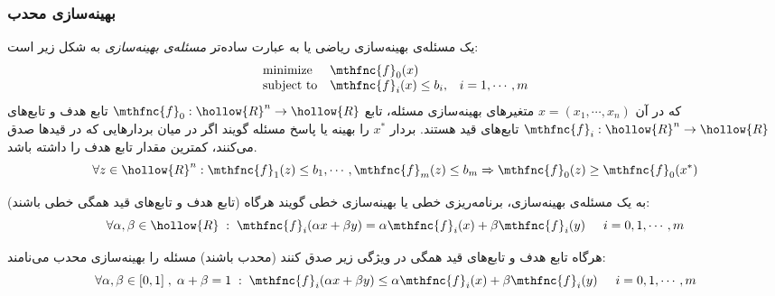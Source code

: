 
\subsubsection{
بهینه‌سازی محدب
\cite{convexoptimization}
}


یک مسئله‌ی بهینه‌سازی ریاضی یا به عبارت ساده‌تر 
\emph{
مسئله‌ی بهینه‌سازی
} 
به شکل زیر است:
\[
\begin{array}{lll}
\mbox{minimize} & \mthfnc{f}_0(x) & \\
\mbox{subject to} & \mthfnc{f}_i(x) \leq b_i, & i = 1, \cdots, m
\end{array}
\]
که در آن 
$x = (x_1, \cdots, x_n)$ 
متغیرهای بهینه‌سازی مسئله، تابع 
$\mthfnc{f}_0: \hollow{R}^n \rightarrow \hollow{R}$ 
تابع هدف
و تابع‌های 
$\mthfnc{f}_i: \hollow{R}^n \rightarrow \hollow{R}$ 
تابع‌های قید
هستند. بردار 
$x^*$ 
را بهینه
یا پاسخ مسئله گویند اگر در میان بردارهایی که در قید‌ها صدق می‌کنند، کمترین مقدار تابع هدف را داشته باشد.
\[
\forall z \in \hollow{R}^n: \mthfnc{f}_1(z) \leq b_1 , \cdots, \mthfnc{f}_m(z) \leq b_m \Rightarrow \mthfnc{f}_0(z) \geq \mthfnc{f}_0(x^*)
\]

به یک مسئله‌ی بهینه‌سازی، برنامه‌ریزی خطی
یا بهینه‌سازی خطی
گویند هرگاه (تابع هدف و تابع‌های قید همگی خطی باشند):
\[
\forall \alpha,\beta \in \hollow{R} \; : \; \mthfnc{f}_i( \alpha x + \beta y ) = \alpha \mthfnc{f}_i(x) + \beta \mthfnc{f}_i(y) \hspace{5mm} i = 0,1,\cdots,m
\]

هرگاه تابع هدف و تابع‌های قید همگی در ویژگی زیر صدق کنند (محدب
باشند) مسئله را بهینه‌سازی محدب
می‌نامند:
\[
\forall \alpha,\beta \in [0,1] \; , \; \alpha + \beta = 1 \; : \; \mthfnc{f}_i( \alpha x + \beta y ) \leq \alpha \mthfnc{f}_i(x) + \beta \mthfnc{f}_i(y) \hspace{5mm} i = 0,1,\cdots,m
\]


